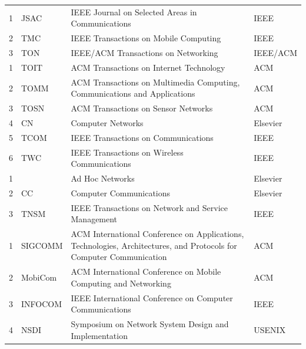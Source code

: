 \documentclass[QingNianC, vlined, timesmathnogreek]{nsfc}
\begin{document}
\begin{longtable}{m{2em}<{\centering} p{4.5em} p{15em} p{6em}}
		1 & JSAC & IEEE Journal on Selected Areas in Communications & IEEE \\
		2 & TMC & IEEE Transactions on Mobile Computing & IEEE \\
		3 & TON & IEEE/ACM Transactions on Networking & IEEE/ACM \\
		1 & TOIT & ACM Transactions on Internet Technology & ACM \\
		2 & TOMM & ACM Transactions on Multimedia Computing, Communications and Applications & ACM \\
		3 & TOSN & ACM Transactions on Sensor Networks & ACM \\
		4 & CN & Computer Networks & Elsevier \\
		5 & TCOM & IEEE Transactions on Communications & IEEE \\
		6 & TWC & IEEE Transactions on Wireless Communications & IEEE \\
		1 & & Ad Hoc Networks & Elsevier \\
		2 & CC & Computer Communications & Elsevier\tablenoteref{tn: 手动跨页表格附注标签Elsevier} \\
		3 & TNSM & IEEE Transactions on Network and Service Management & IEEE \\
		1 & SIGCOMM & ACM International Conference on Applications, Technologies, Architectures, and Protocols for Computer Communication & ACM \\
		2 & MobiCom & ACM International Conference on Mobile Computing and Networking & ACM \\
		3 & INFOCOM & IEEE International Conference on Computer Communications & IEEE \\
		4 & NSDI & Symposium on Network System Design and Implementation & USENIX\tablenoteref{tn: 手动跨页表格附注标签USENIX} \\

\end{longtable}
\end{document}
